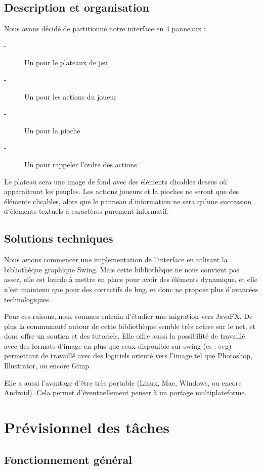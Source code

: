 \documentclass[11pt]{report}
\begin{document}
	\section{Description et organisation}
		Nous avons décidé de partitionné notre interface en 4 panneaux :
		\begin{description}
			\item[-]Un pour le plateaux de jeu
			\item[-]Un pour les actions du joueur
			\item[-]Un pour la pioche
			\item[-]Un pour rappeler l'ordre des actions
		\end{description}	
		
		Le plateau sera une image de fond avec des éléments clicables dessus où apparaitront les peuples. Les actions joueurs et la pioches ne seront que des éléments clicables, alors	que le panneau d'information ne sera qu'une succession d'élements textuels à caractères purement informatif.  
	\section{Solutions techniques}
		Nous avions commencer une implementation de l'interface en utlisant la bibliothèque graphique Swing. Mais cette bibliothèque ne nous convient pas assez, elle est lourde à mettre en place pour avoir des éléments dynamique, et elle n'est maintenu que pour des correctifs de bug, et donc ne propose plus d'avancées technologiques. 
		
		Pour ces raisons, nous sommes entrain d'étudier une migration vers JavaFX. De plus la communauté autour de cette bibliothèque semble très active sur le net, et donc offre un soutien et des tutoriels. Elle offre aussi la possibilité de travaillé avec des formats d'image en plus que ceux disponible sur swing (es : svg) permettant de travaillé avec des logiciels orienté vers l'image tel que Photoshop\up{\copyright}, Illustrator\up{\copyright}, ou encore Gimp\up{\copyright}. 
		
		Elle a aussi l'avantage d'être très portable (Linux, Mac, Windows, ou encore Android). Cela permet d'éventuellement penser à un portage multiplateforme.
\chapter{Prévisionnel des tâches}

	\section{Fonctionnement général}
\end{document}
